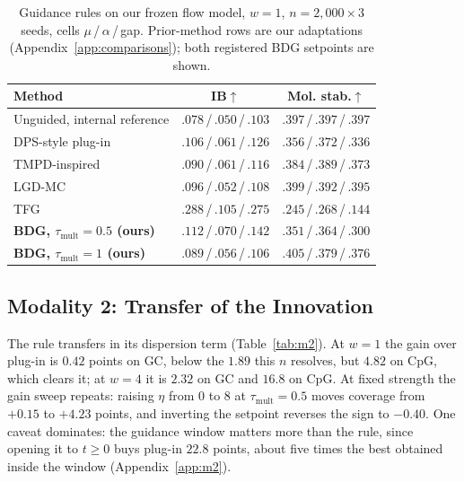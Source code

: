 \documentclass{article}
\begin{document}
\begin{table}[!htbp]
\centering\small
\caption{Guidance rules on our frozen flow model, $w{=}1$, $n{=}2{,}000\times3$ seeds, cells $\mu$\,/\,$\alpha$\,/\,gap. Prior-method rows are our adaptations (Appendix~\ref{app:comparisons}); both registered BDG setpoints are shown.}
\label{tab:recent}
\begin{tabular}{lcc}
\toprule
Method & IB$\uparrow$ & Mol. stab.$\uparrow$\\
\midrule
Unguided, internal reference & $.078$\,/\,$.050$\,/\,$.103$ & $.397$\,/\,$.397$\,/\,$.397$\\
\midrule
DPS-style plug-in \citep{chung2023dps} & $.106$\,/\,$.061$\,/\,$.126$ & $.356$\,/\,$.372$\,/\,$.336$\\
TMPD-inspired \citep{boys2024tmpd} & $.090$\,/\,$.061$\,/\,$.116$ & $.384$\,/\,$.389$\,/\,$.373$\\
LGD-MC \citep{song2023lgd} & $.096$\,/\,$.052$\,/\,$.108$ & $.399$\,/\,$.392$\,/\,$.395$\\
TFG \citep{ye2024tfg} & $.288$\,/\,$.105$\,/\,$.275$ & $.245$\,/\,$.268$\,/\,$.144$\\
\midrule
\textbf{BDG, $\tau_{\mathrm{mult}}{=}0.5$ (ours)} & $.112$\,/\,$.070$\,/\,$.142$ & $.351$\,/\,$.364$\,/\,$.300$\\
\textbf{BDG, $\tau_{\mathrm{mult}}{=}1$ (ours)} & $.089$\,/\,$.056$\,/\,$.106$ & $.405$\,/\,$.379$\,/\,$.376$\\
\bottomrule
\end{tabular}
\end{table}


\subsection{Modality 2: Transfer of the Innovation}\label{sec:m2}
The rule transfers in its dispersion term (Table~\ref{tab:m2}). At $w{=}1$ the gain over plug-in is $0.42$ points on GC, below the $1.89$ this $n$ resolves, but $4.82$ on CpG, which clears it; at $w{=}4$ it is $2.32$ on GC and $16.8$ on CpG. At fixed strength the gain sweep repeats: raising $\eta$ from 0 to 8 at $\tau_{\mathrm{mult}}{=}0.5$ moves coverage from $+0.15$ to $+4.23$ points, and inverting the setpoint reverses the sign to $-0.40$. One caveat dominates: the guidance window matters more than the rule, since opening it to $t\ge0$ buys plug-in $22.8$ points, about five times the best obtained inside the window (Appendix~\ref{app:m2}).
\end{document}
